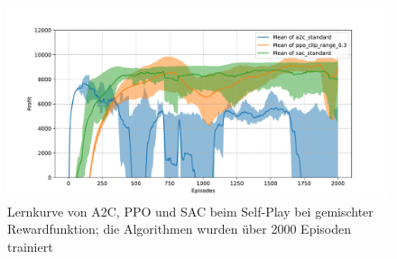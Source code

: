 \begin{figure}[htbp]
	\centering
	\includegraphics[width=\textwidth]{appendix/self_play_mixed.pdf}
	\caption{Lernkurve von A2C, PPO und SAC beim Self-Play bei gemischter Rewardfunktion; die Algorithmen wurden über 2000 Episoden trainiert}
	\label{grafic:SelfPlayMixedLearningCurve}
\end{figure}